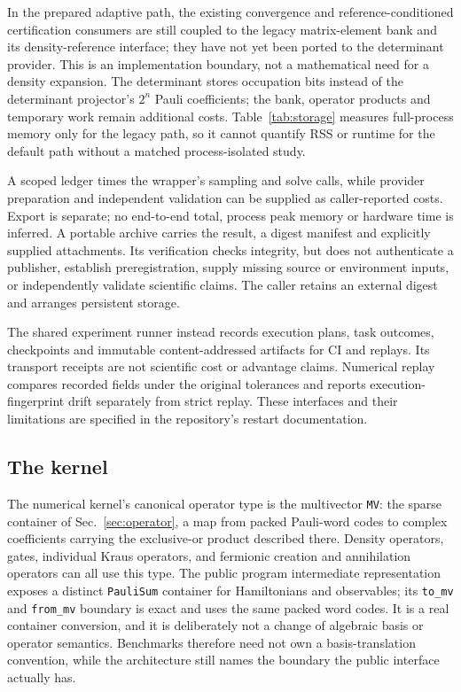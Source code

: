 \documentclass[aps,pra,reprint,superscriptaddress,nofootinbib,floatfix,
  showkeys]{revtex4-2}
\begin{document}
In the prepared adaptive path, the existing convergence and
reference-conditioned certification consumers are still coupled to the legacy
matrix-element bank and its density-reference interface; they have not yet been
ported to the determinant provider. This is an implementation boundary, not a
mathematical need for a density expansion. The determinant stores occupation
bits instead of the determinant projector's $2^n$ Pauli coefficients; the bank,
operator products and temporary work remain additional costs. Table~\ref{tab:storage}
measures full-process memory only for the legacy path, so it cannot quantify
RSS or runtime for the default path without a matched process-isolated study.

A scoped ledger times the wrapper's sampling and solve calls, while provider
preparation and independent validation can be supplied as caller-reported
costs. Export is separate; no end-to-end total, process peak memory or hardware
time is inferred. A portable archive carries the result, a digest manifest and
explicitly supplied attachments. Its verification checks integrity, but does
not authenticate a publisher, establish preregistration, supply missing source
or environment inputs, or independently validate scientific claims. The caller
retains an external digest and arranges persistent storage.

The shared experiment runner instead records execution plans, task outcomes,
checkpoints and immutable content-addressed artifacts for CI and replays. Its
transport receipts are not scientific cost or advantage claims. Numerical
replay compares recorded fields under the original tolerances and reports
execution-fingerprint drift separately from strict replay. These interfaces and
their limitations are specified in the repository's restart documentation.

\subsection{The kernel}

The numerical kernel's canonical operator type is the multivector \texttt{MV}:
the sparse container of Sec.~\ref{sec:operator}, a map from packed Pauli-word
codes to complex coefficients carrying the exclusive-or product described
there. Density operators, gates, individual Kraus operators, and fermionic
creation and annihilation operators can all use this type.  The public program intermediate
representation exposes a distinct \texttt{PauliSum} container for Hamiltonians
and observables; its
\texttt{to\_mv} and \texttt{from\_mv} boundary is exact and uses the same packed
word codes.  It is a real container conversion, and it is deliberately not a
change of algebraic basis or operator semantics.  Benchmarks therefore need not
own a basis-translation convention, while the architecture still names the
boundary the public interface actually has.
\end{document}

